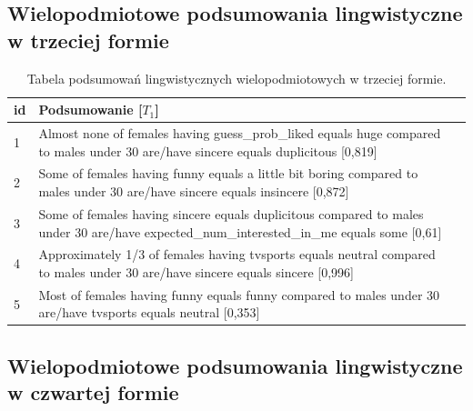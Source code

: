 \documentclass{classrep}
\begin{document}
\subsection{Wielopodmiotowe podsumowania lingwistyczne w trzeciej formie}

\begin{center}
  \begin{table}[H]
    \begin{tabularx}{\textwidth}{lXc}
    
    id & Podsumowanie [$T_1$] \\ \hline 
  
    1 & Almost none of females having guess\_prob\_liked equals huge compared to males under 30 are/have sincere equals duplicitous [0,819] \\\hline
    2 & Some of females having funny equals a little bit boring compared to males under 30 are/have sincere equals insincere [0,872] \\  \hline
    3 & Some of females having sincere equals duplicitous compared to males under 30 are/have expected\_num\_interested\_in\_me equals some [0,61] \\ \hline
    4 & Approximately 1/3 of females having tvsports equals neutral compared to males under 30 are/have sincere equals sincere [0,996] \\ \hline
    5 & Most of females having funny equals funny compared to males under 30 are/have tvsports equals neutral [0,353]\\ \hline
    
  \end{tabularx}
  \caption{Tabela podsumowań lingwistycznych wielopodmiotowych w trzeciej formie.}
\end{table}
\end{center}

\subsection{Wielopodmiotowe podsumowania lingwistyczne w czwartej formie}
\end{document}
